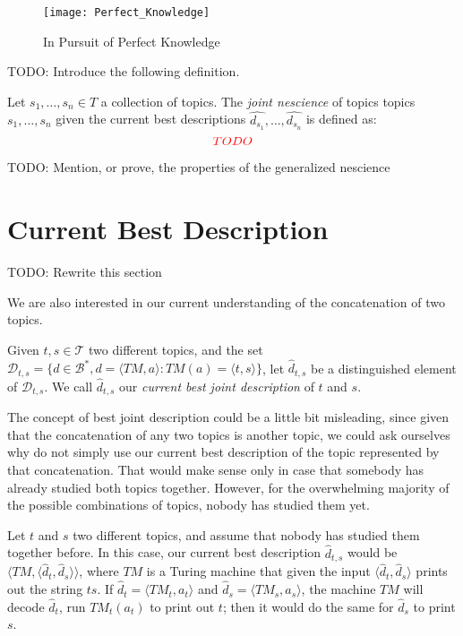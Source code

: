 \begin{figure}[h]
\centering\texttt{[image: Perfect\_Knowledge]}
\caption{\label{fig:Perfect_Knowledge}In Pursuit of Perfect Knowledge}
\end{figure}

{\color{red} TODO: Introduce the following definition.}

\begin{definition}
Let $s_{1}, \ldots, s_{n} \in T$ a collection of topics. The \emph{joint nescience} of topics topics $s_{1}, \ldots, s_{n}$ given the current best descriptions $\hat{d_{s_1}}, \ldots, \hat{d_{s_n}}$ is defined as: 
\[
{\color{red} TODO}
\]
\end{definition}

{\color{red} TODO: Mention, or prove, the properties of the generalized nescience}

%
%

\section{Current Best Description}

{\color{red} TODO: Rewrite this section}

We are also interested in our current understanding of the concatenation of two topics.

\begin{definition}
Given $t,s \in \mathcal{T}$ two different topics, and the set $\mathcal{D}_{t,s} = \{ d \in \mathcal{B}^\ast, d = \langle TM,a \rangle : TM(a) = \langle t,s \rangle \}$, let $\hat{d}_{t,s}$ be a distinguished element of $\mathcal{D}_{t,s}$. We call $\hat{d}_{t,s}$ our \emph{current best joint description} of $t$ and $s$.
\end{definition}

The concept of best joint description could be a little bit misleading, since given that the concatenation of any two topics is another topic, we could ask ourselves why do not simply use our current best description of the topic represented by that concatenation. That would make sense only in case that somebody has already studied both topics together. However, for the overwhelming majority of the possible combinations of topics, nobody has studied them yet.

\begin{example}
\label{ex:unknown_join}
Let $t$ and $s$ two different topics, and assume that nobody has studied them together before. In this case, our current best description $\hat{d}_{t, s}$ would be $\langle TM, \langle \hat{d}_t, \hat{d}_s \rangle \rangle$, where $TM$ is a Turing machine that given the input $\langle \hat{d}_t, \hat{d}_s \rangle$ prints out the string $ts$. If $\hat{d}_t = \langle TM_t, a_t \rangle$ and $\hat{d}_s = \langle TM_s, a_s \rangle$, the machine $TM$ will decode $\hat{d}_t$, run $TM_t(a_t)$ to print out $t$; then it would do the same for $\hat{d}_s$ to print $s$.
\end{example}

